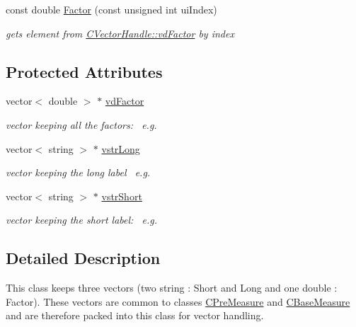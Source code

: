 \begin{DoxyCompactItemize}
const double \hyperlink{classCVectorHandle_ae07ef54ee4ecb2da32176e58cf852e7c}{Factor} (const unsigned int ui\+Index)
\begin{DoxyCompactList}\small\item\em gets element from \hyperlink{classCVectorHandle_af8f8b2e0da8363e695872ca85f33364e}{C\+Vector\+Handle\+::vd\+Factor} by index \end{DoxyCompactList}\end{DoxyCompactItemize}
\subsection*{Protected Attributes}
\begin{DoxyCompactItemize}
\item 
vector$<$ double $>$ $\ast$ \hyperlink{classCVectorHandle_af8f8b2e0da8363e695872ca85f33364e}{vd\+Factor}
\begin{DoxyCompactList}\small\item\em vector keeping all the factors\+:~\newline
 e.\+g. \end{DoxyCompactList}\item 
vector$<$ string $>$ $\ast$ \hyperlink{classCVectorHandle_a71bec0e385b9ca8e5ffa174b559da9f8}{vstr\+Long}
\begin{DoxyCompactList}\small\item\em vector keeping the long label~\newline
 e.\+g. \end{DoxyCompactList}\item 
vector$<$ string $>$ $\ast$ \hyperlink{classCVectorHandle_afb50c8a33d4cf70bf92c644dca409ea2}{vstr\+Short}
\begin{DoxyCompactList}\small\item\em vector keeping the short label\+:~\newline
 e.\+g. \end{DoxyCompactList}\end{DoxyCompactItemize}


\subsection{Detailed Description}
This class keeps three vectors (two string \+: Short and Long and one double \+: Factor). These vectors are common to classes \hyperlink{classCPreMeasure}{C\+Pre\+Measure} and \hyperlink{classCBaseMeasure}{C\+Base\+Measure} and are therefore packed into this class for vector handling. 

